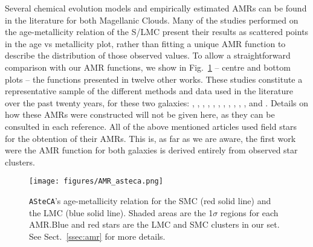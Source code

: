 \documentclass[a4paper,fleqn,usenatbib]{mnras}
\begin{document}
Several chemical evolution models and empirically estimated AMRs can be found in
the literature for both Magellanic Clouds. Many of the studies performed on the
age-metallicity relation of the S/LMC present their results as scattered points
in the age vs metallicity plot, rather than fitting a unique AMR function to
describe the distribution of those observed values.
%
To allow a straightforward comparison with our AMR functions, we show in
Fig.~\ref{fig:amr} -- centre and bottom plots -- the
functions presented in twelve other works.
These studies constitute a representative sample of the different methods and
data used in the literature over the past twenty years, for these two
galaxies:
\citet[][PT98; bursting models]{Pagel_1998}, \citet[][G98; closed-box model
with Holtzman SFH]{Geha_1998}, \citet[][HZ04]{Harris_2004}, \citet[][C08a;
average of four disk frames]{Carrera_2008_lmc}, \citet[][C08b; average of
thirteen frames]{Carrera_2008_smc}, \citet[][HZ09]{Harris_2009}, \citet[][N09;
5th degree polynomial fit to the AMRs of their three observed regions]
{Noel_2009}, \citet[][TB09; 1: no merger model, 2: equal mass merger, 3: one
to four merger]{Tsujimoto_2009}, \citet[][R12; four tiles average]{Rubele_2012},
\citet[][C13; B: Bologna, C: Cole]{Cignoni_2013}, \citet[][PG13]
{Piatti_Geisler_2013}, and \citet[][M14; 0: field LMC0, 1: field LMC1 , 2: field
LMC2]{Meschin_2014}.
Details on how these AMRs were constructed will not be given here, as
they can be consulted in each reference.
%
All of the above mentioned articles used field stars for the obtention
of their AMRs. This is, as far as we are aware, the first work were the AMR
function for both galaxies is derived entirely from observed star clusters.


\begin{figure}
\texttt{[image: figures/AMR\_asteca.png]}
\caption{\texttt{ASteCA}'s age-metallicity relation for the SMC (red solid line)
and the LMC (blue solid line). Shaded areas are the 1$\sigma$ regions for each
AMR.\@ Blue and red stars are the LMC and SMC clusters in our set. See
Sect.~\ref{ssec:amr} for more details.}
\label{fig:amr}
\end{figure}
\end{document}
